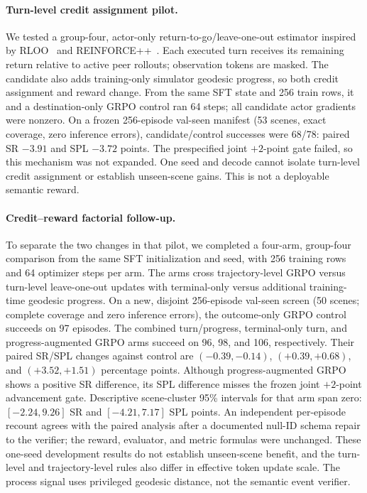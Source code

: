 \documentclass[10pt,twocolumn,letterpaper]{article}
\begin{document}
\paragraph{Turn-level credit assignment pilot.} We tested a
group-four, actor-only return-to-go/leave-one-out estimator inspired by
RLOO~\cite{ahmadian2024back} and REINFORCE++~\cite{hu2025reinforcepp}.
Each executed turn receives its remaining return relative to active
peer rollouts; observation tokens are masked. The candidate also adds
training-only simulator geodesic progress, so both credit assignment
and reward change. From the same SFT state and 256 train rows, it and
a destination-only GRPO control ran 64 steps; all candidate actor
gradients were nonzero. On a frozen 256-episode val-seen manifest
(53 scenes, exact coverage, zero inference errors), candidate/control
successes were 68/78: paired SR $-3.91$ and SPL $-3.72$ points.
The prespecified joint $+2$-point gate failed, so this mechanism was
not expanded. One seed and decode cannot isolate turn-level credit
assignment or establish unseen-scene gains. This is not a deployable
semantic reward.

\paragraph{Credit--reward factorial follow-up.} To separate the two
changes in that pilot, we completed a four-arm, group-four comparison
from the same SFT initialization and seed, with 256 training rows and
64 optimizer steps per arm. The arms cross trajectory-level GRPO versus
turn-level leave-one-out updates with terminal-only versus additional
training-time geodesic progress. On a new, disjoint 256-episode val-seen
screen (50 scenes; complete coverage and zero inference errors), the
outcome-only GRPO control succeeds on 97 episodes. The combined
turn/progress, terminal-only turn, and progress-augmented GRPO arms
succeed on 96, 98, and 106, respectively. Their paired SR/SPL changes
against control are $(-0.39,-0.14)$, $(+0.39,+0.68)$, and
$(+3.52,+1.51)$ percentage points. Although progress-augmented GRPO
shows a positive SR difference, its SPL difference misses the frozen
joint $+2$-point advancement gate. Descriptive scene-cluster 95\%
intervals for that arm span zero: $[-2.24,9.26]$ SR and $[-4.21,7.17]$
SPL points. An independent per-episode recount agrees with the paired
analysis after a documented null-ID schema repair to the verifier;
the reward, evaluator, and metric formulas were unchanged. These
one-seed development results do not establish unseen-scene benefit,
and the turn-level and trajectory-level rules also differ in effective
token update scale. The process signal uses privileged geodesic
distance, not the semantic event verifier.
\end{document}
